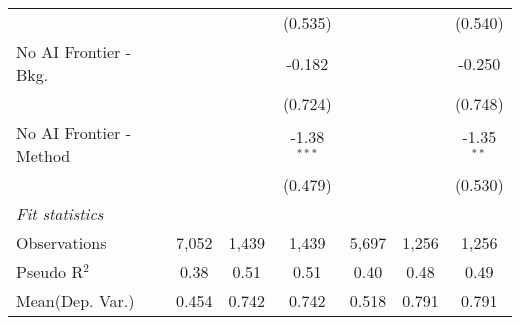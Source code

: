 \begin{tabular}{lcccccc}
                           &               &         & (0.535)       &               &         & (0.540)\\   
   No AI Frontier - Bkg.   &               &         & -0.182        &               &         & -0.250\\   
                           &               &         & (0.724)       &               &         & (0.748)\\   
   No AI Frontier - Method &               &         & -1.38$^{***}$ &               &         & -1.35$^{**}$\\   
                           &               &         & (0.479)       &               &         & (0.530)\\   
   \midrule
   \emph{Fit statistics}\\
   Observations            & 7,052         & 1,439   & 1,439         & 5,697         & 1,256   & 1,256\\  
   Pseudo R$^2$            & 0.38          & 0.51    & 0.51          & 0.40          & 0.48    & 0.49\\  
Mean(Dep. Var.) & 0.454 & 0.742 & 0.742 & 0.518 & 0.791 & 0.791 \\
   

\end{tabular}
